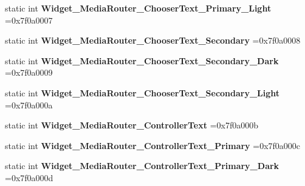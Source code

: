\begin{DoxyCompactItemize}
static int {\bfseries Widget\+\_\+\+Media\+Router\+\_\+\+Chooser\+Text\+\_\+\+Primary\+\_\+\+Light} =0x7f0a0007
\item 
\mbox{\label{classandroid_1_1support_1_1graphics_1_1drawable_1_1animated_1_1R_1_1style_a49fb359232ffe5cff07b07f679983472}} 
static int {\bfseries Widget\+\_\+\+Media\+Router\+\_\+\+Chooser\+Text\+\_\+\+Secondary} =0x7f0a0008
\item 
\mbox{\label{classandroid_1_1support_1_1graphics_1_1drawable_1_1animated_1_1R_1_1style_a7999ed38d044f170d6dd14f5972d26bc}} 
static int {\bfseries Widget\+\_\+\+Media\+Router\+\_\+\+Chooser\+Text\+\_\+\+Secondary\+\_\+\+Dark} =0x7f0a0009
\item 
\mbox{\label{classandroid_1_1support_1_1graphics_1_1drawable_1_1animated_1_1R_1_1style_aad2e177f58cf147d2dba791162a80b78}} 
static int {\bfseries Widget\+\_\+\+Media\+Router\+\_\+\+Chooser\+Text\+\_\+\+Secondary\+\_\+\+Light} =0x7f0a000a
\item 
\mbox{\label{classandroid_1_1support_1_1graphics_1_1drawable_1_1animated_1_1R_1_1style_a86101b6bdd24fde424cf4645abe42f09}} 
static int {\bfseries Widget\+\_\+\+Media\+Router\+\_\+\+Controller\+Text} =0x7f0a000b
\item 
\mbox{\label{classandroid_1_1support_1_1graphics_1_1drawable_1_1animated_1_1R_1_1style_ae055659f25d89ad0b50eb25fc353d5aa}} 
static int {\bfseries Widget\+\_\+\+Media\+Router\+\_\+\+Controller\+Text\+\_\+\+Primary} =0x7f0a000c
\item 
\mbox{\label{classandroid_1_1support_1_1graphics_1_1drawable_1_1animated_1_1R_1_1style_a124190faa8e67917b01849a643bfa932}} 
static int {\bfseries Widget\+\_\+\+Media\+Router\+\_\+\+Controller\+Text\+\_\+\+Primary\+\_\+\+Dark} =0x7f0a000d
\item 
\mbox{\label{classandroid_1_1support_1_1graphics_1_1drawable_1_1animated_1_1R_1_1style_a9460db075202b2cc16744c6a1044506e}} 

\end{DoxyCompactItemize}
